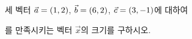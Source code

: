 세 벡터 $\vec{a}=(1{,}\mkern3mu\mathopen{}2)$, $\vec{b}=(6{,}\mkern3mu\mathopen{}2)$, $\vec{c}=(3{,}\mkern3mu\mathopen{}-1)$에 대하여 \par\smallskip{}\par\smallskip\noindent 를 만족시키는 벡터 $\vec{x}$의 크기를 구하시오.
